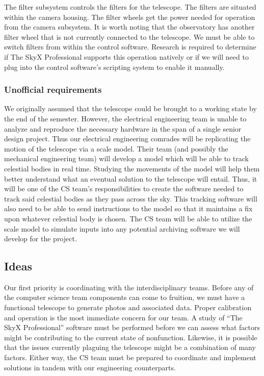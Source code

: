 \documentclass[12pt]{report}
\begin{document}
The filter subsystem controls the filters for the telescope. The filters are situated within the camera housing. The filter wheels get the power needed for operation from the camera subsystem. It is worth noting that the observatory has another filter wheel that is not currently connected to the telescope. We must be able to switch filters from within the control software. Research is required to determine if The SkyX Professional supports this operation natively or if we will need to plug into the control software’s scripting system to enable it manually.

\subsubsection*{Unofficial requirements}

We originally assumed that the telescope could be brought to a working state by the end of the semester. However, the electrical engineering team is unable to analyze and reproduce the necessary hardware in the span of a single senior design project. Thus our electrical engineering comrades will be replicating the motion of the telescope via a scale model. Their team (and possibly the mechanical engineering team) will develop a model which will be able to track celestial bodies in real time. Studying the movements of the model will help them better understand what an eventual solution to the telescope will entail. Thus, it will be one of the CS team’s responsibilities to create the software needed to track said celestial bodies as they pass across the sky. This tracking software will also need to be able to send instructions to the model so that it maintains a fix upon whatever celestial body is chosen. The CS team will be able to utilize the scale model to simulate inputs into any potential archiving software we will develop for the project.

\subsection*{Ideas}

Our first priority is coordinating with the interdisciplinary teams. Before any of the computer science team components can come to fruition, we must have a functional telescope to generate photos and associated data. Proper calibration and operation is the most immediate concern for our team. A study of “The SkyX Professional” software must be performed before we can assess what factors might be contributing to the current state of nonfunction. Likewise, it is possible that the issues currently plaguing the telescope might be a combination of many factors. Either way, the CS team must be prepared to coordinate and implement solutions in tandem with our engineering counterparts.
\end{document}

